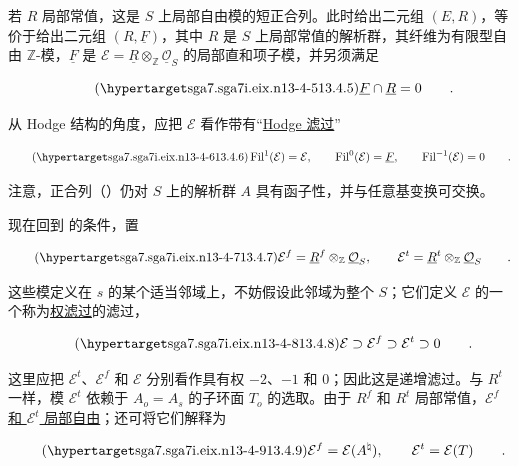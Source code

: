 \noindent
若 $R$ 局部常值，这是 $S$ 上局部自由模的短正合列。此时给出二元组 $(E,R)$，等价于给出二元组 $(R,\underline F)$，其中 $R$ 是 $S$ 上局部常值的解析群，其纤维为有限型自由 $\mathbb Z$-模，$\underline F$ 是 $\mathcal E=\underline R\otimes_{\mathbb Z}\underline{\mathcal O}_S$ 的局部直和项子模，并另须满足

\begin{equation}\tag{\SGARefTarget{sga7.sga7i.eix.n13-4-5}{13.4.5}}
 \underline F\cap\underline R=0\qquad .
\end{equation}

\noindent
从 Hodge 结构的角度，应把 $\mathcal E$ 看作带有“\underline{Hodge 滤过}”

\begin{equation}\tag{\SGARefTarget{sga7.sga7i.eix.n13-4-6}{13.4.6}}
 \operatorname{Fil}^{1}(\mathcal E)=\mathcal E,
 \qquad \operatorname{Fil}^{0}(\mathcal E)=\underline F,
 \qquad \operatorname{Fil}^{-1}(\mathcal E)=0\qquad .
\end{equation}

\noindent
注意，正合列（）仍对 $S$ 上的解析群 $A$ 具有函子性，并与任意基变换可交换。

现在回到  的条件，置

\begin{equation}\tag{\SGARefTarget{sga7.sga7i.eix.n13-4-7}{13.4.7}}
 \mathcal E^f=\underline R^f\otimes_{\mathbb Z}
 \underline{\mathcal O}_S,
 \qquad
 \mathcal E^t=\underline R^t\otimes_{\mathbb Z}
 \underline{\mathcal O}_S\qquad .
\end{equation}

\noindent
这些模定义在 $s$ 的某个适当邻域上，不妨假设此邻域为整个 $S$；它们定义 $\mathcal E$ 的一个称为\underline{权滤过}的滤过，

\begin{equation}\tag{\SGARefTarget{sga7.sga7i.eix.n13-4-8}{13.4.8}}
 \mathcal E\supset\mathcal E^f\supset\mathcal E^t\supset0\qquad .
\end{equation}

\noindent
这里应把 $\mathcal E^t$、$\mathcal E^f$ 和 $\mathcal E$ 分别看作具有权 $-2$、$-1$ 和 $0$；因此这是递增滤过。与 $R^t$ 一样，模 $\mathcal E^t$ 依赖于 $A_o=A_s$ 的子环面 $T_o$ 的选取。由于 $R^f$ 和 $R^t$ 局部常值，\underline{$\mathcal E^f$ 和 $\mathcal E^t$ 局部自由}；还可将它们解释为

\begin{equation}\tag{\SGARefTarget{sga7.sga7i.eix.n13-4-9}{13.4.9}}
 \mathcal E^f=\mathcal E(A^\natural),
 \qquad \mathcal E^t=\mathcal E(T)\qquad .
\end{equation}

